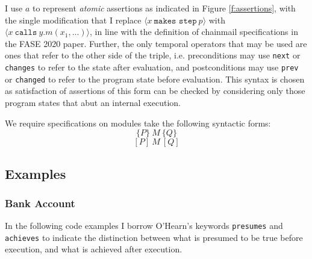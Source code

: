 \documentclass[12pt]{article}
\begin{document}
		I use $a$ to represent \emph{atomic} assertions as indicated in Figure \ref{f:assertions}, with the single modification that I replace $ \langle x\ \texttt{makes step}\ p \rangle$ 
		with  $\langle x\ \texttt{calls}\ y.m(x_1, ...) \rangle$, in line with the definition of chainmail specifications in the FASE 2020 paper. Further, the only temporal operators that may 
		be used are ones that refer to the other side of the triple, i.e. preconditions may use \texttt{next} or \texttt{changes} to refer to the state after evaluation, and postconditions 
		may use \texttt{prev} or \texttt{changed} to refer to the program state before evaluation.
		This syntax is chosen as satisfaction of assertions of this form can be checked by considering only those program states that abut an internal execution.
		
		We require specifications on modules take the following syntactic forms:
	$$\{P\}\ M\ \{Q\}$$
	$$[P]\ M\ [Q]$$

	\subsection{Examples}
	
	\subsubsection{Bank Account}

	
	In the following code examples I borrow O'Hearn's keywords \texttt{presumes} and \texttt{achieves} to indicate 
	the distinction between what is presumed to be true before execution, and what is achieved after execution.
\end{document}
